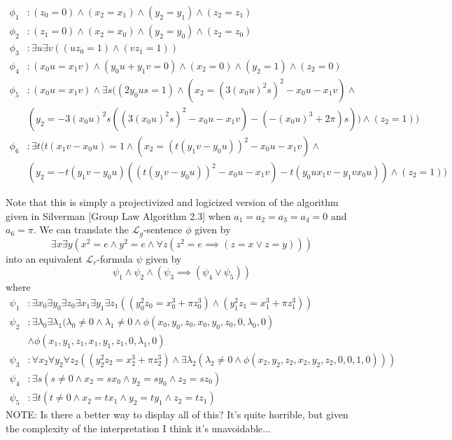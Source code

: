 \begin{example}
\begin{itemize}
		\begin{align*}
		\phi_1 &: (z_0=0)\wedge (x_2=x_1)\wedge (y_2=y_1)\wedge (z_2=z_1)\\
		\phi_2 &: (z_1=0)\wedge (x_2=x_0)\wedge (y_2=y_0)\wedge (z_2=z_0)\\
		\phi_3 &: \exists u\exists v((uz_0=1)\wedge (vz_1=1))\\
		\phi_4 &: (x_0u=x_1v)\wedge (y_0u+y_1v=0)\wedge (x_2=0)\wedge (y_2=1)\wedge (z_2=0)\\
		\phi_5 &: (x_0u=x_1v)\wedge \exists s ((2y_0us=1)\wedge (x_2=(3(x_0u)^2s)^2-x_0u-x_1v)\wedge\\& (y_2=-3(x_0u)^2s((3(x_0u)^2s)^2-x_0u-x_1v)-(-(x_0u)^3+2\pi)s))\wedge (z_2=1))\\
		\phi_6 &: \exists t (t(x_1v-x_0u)=1\wedge (x_2= (t(y_1v-y_0u))^2-x_0u-x_1v)\wedge\\& (y_2=-t(y_1v-y_0u)((t(y_1v-y_0u))^2-x_0u-x_1v)-t(y_0ux_1v-y_1vx_0u))\wedge (z_2=1))
		\end{align*}

		Note that this is simply a projectivized and logicized version of the algorithm given in Silverman \cite{silverman2009arithmetic}[Group Law Algorithm 2.3] when $a_1=a_2=a_3=a_4=0$ and  $a_6=\pi$. We can translate the $\mathcal{L}_g$-sentence $\phi$ given by \begin{equation}
		\exists x\exists y (x^2=e\wedge y^2=e\wedge\forall z(z^2=e\implies (z=x\vee z=y)))
		\end{equation}
		into an equivalent $\mathcal{L}_r$-formula $\psi$ given by \begin{equation}\psi_1\wedge\psi_2\wedge (\psi_3\implies(\psi_4 \vee \psi_5))
		\end{equation}
		where
		\begin{align*}
		\psi_1 &: \exists x_0\exists y_0\exists z_0\exists x_1\exists y_1\exists z_1((y_0^2z_0=x_0^3+\pi z_0^3)\wedge (y_1^2z_1=x_1^3+\pi z_1^3))\\
		\psi_2 &: \exists \lambda_0\exists\lambda_1(\lambda_0\neq 0\wedge\lambda_1\neq 0 \wedge\phi(x_0,y_0,z_0,x_0,y_0,z_0,0,\lambda_0,0)\\&\wedge\phi(x_1,y_1,z_1,x_1,y_1,z_1,0,\lambda_1,0)\\
		\psi_3 &: \forall x_2\forall y_2\forall z_2 ((y_2^2z_2=x_2^3+\pi z_2^3) \wedge \exists\lambda_2(\lambda_2\neq 0\wedge\phi(x_2,y_2,z_2,x_2,y_2,z_2,0,0,1,0)))\\
		\psi_4 &: \exists s (s\neq 0\wedge x_2=sx_0\wedge y_2=sy_0\wedge z_2=sz_0)\\
		\psi_5 &: \exists t(t\neq 0\wedge x_2=tx_1\wedge y_2=ty_1\wedge z_2=tz_1)
		\end{align*}
		NOTE: Is there a better way to display all of this? It's quite horrible, but given the complexity of the interpretation I think it's unavoidable...
	\end{itemize}
\end{example}

